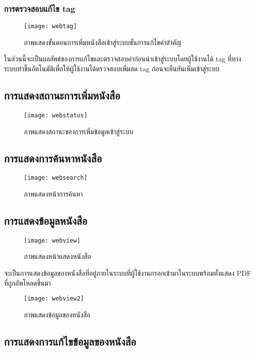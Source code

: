 \subsubsection{การตรวจสอบแก้ไข tag}
\begin{figure}[H]
    \centering
    \texttt{[image: webtag]}
    \caption{ภาพแสดงขั้นตอนการเพิ่มหนังสือเข้าสู่ระบบขั้นการแก้ไขคำสำคัญ}\label{fig:webtag}
\end{figure}
ในส่วนนี้จะเป็นผลลัพธ์ของการแก้ไขและตรวจสอบคำก่อนนำเข้าสู่ระบบโดยผู้ใช้งานได้ tag ที่ทางระบบทำขึ้นอัตโนมัติเพื่อให้ผู้ใช้งานได้ตรวจสอบเพิ่มลด tag ก่อนจะยืนยันเพิ่มเข้าสู่ระบบ
\subsection{การแสดงสถานะการเพิ่มหนังสือ}
\begin{figure}[H]
    \centering
    \texttt{[image: webstatus]}
    \caption{ภาพแสดงสถานะของการเพิ่มข้อมูลเข้าสู่ระบบ}\label{fig:webstatus}
\end{figure}

\subsection{การแสดงการค้นหาหนังสือ}
\begin{figure}[H]
    \centering
    \texttt{[image: websearch]}
    \caption{ภาพแสดงหน้าการค้นหา}\label{fig:websearch}
\end{figure}

\subsection{การแสดงข้อมูลหนังสือ}
\begin{figure}[H]
    \centering
    \texttt{[image: webview]}
    \caption{ภาพแสดงหน้าแสดงหนังสือ}\label{fig:webview}
\end{figure}
จะเป็นการแสดงข้อมูลของหนังสือที่อยู่ภายในระบบที่ผู้ใช้งานกรอกเข้ามาในระบบพร้อมทั้งแสดง PDF ที่ถูกอัพโหลดขึ้นมา

\begin{figure}[H]
    \centering
    \texttt{[image: webview2]}
    \caption{ภาพแสดงข้อมูลของหนังสือ}\label{fig:webview2}
\end{figure}

\subsection{การแสดงการแก้ไขข้อมูลของหนังสือ}


